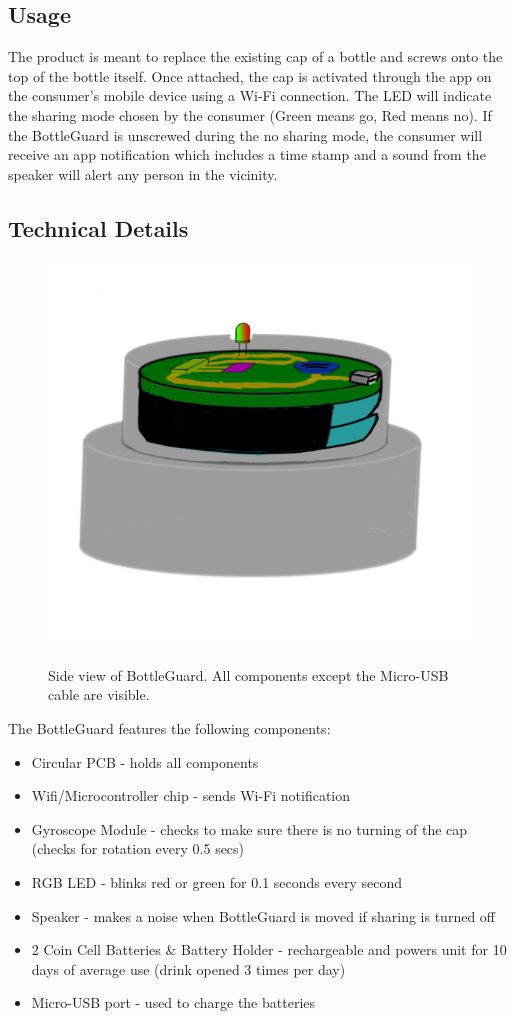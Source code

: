 \documentclass[12pt]{article}
\begin{document}
	\subsection*{Usage}
	The product is meant to replace the existing cap of a bottle and screws onto the top of the bottle itself. Once attached, the cap is activated through the app on the consumer’s mobile device using a Wi-Fi connection. The LED will indicate the sharing mode chosen by the consumer (Green means go, Red means no). If the BottleGuard is unscrewed during the no sharing mode, the consumer will receive an app notification which includes a time stamp and a sound from the speaker will alert any person in the vicinity.
	
	\subsection*{Technical Details}
	\begin{figure}[H]
		\includegraphics[width=\textwidth]{design.png}
		\label{fig:des}
		\caption{Side view of BottleGuard. All components except the Micro-USB cable are visible.}
	\end{figure}
	The BottleGuard features the following components:
	\begin{itemize}
		\item 	Circular PCB - holds all components
		\item 	Wifi/Microcontroller chip - sends Wi-Fi notification
		\item 	Gyroscope Module - checks to make sure there is no turning of the cap (checks for rotation every 0.5 secs)
		\item 	RGB LED - blinks red or green for 0.1 seconds every second
		\item 	Speaker - makes a noise when BottleGuard is moved if sharing is turned off
		\item 	2 Coin Cell Batteries \& Battery Holder - rechargeable and powers unit for 10 days of average use (drink opened 3 times per day)
		\item 	Micro-USB port - used to charge the batteries
	\end{itemize}
\end{document}
